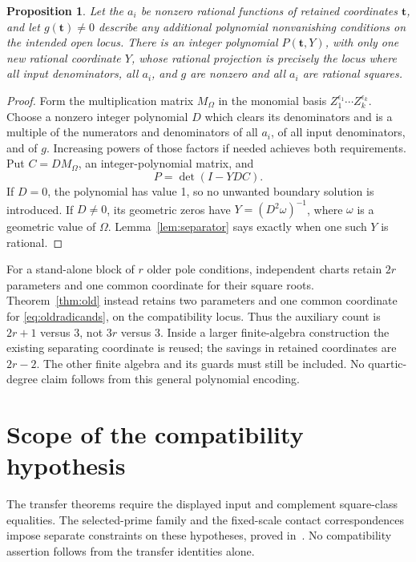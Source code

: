\documentclass[11pt,a4paper]{article}
\newtheorem{proposition}[theorem]{Proposition}
\theoremstyle{definition}\newtheorem{definition}[theorem]{Definition}
\theoremstyle{remark}\newtheorem{remark}[theorem]{Remark}
\begin{document}
\begin{proposition}\label{prop:onecoordinate}
Let the $a_i$ be nonzero rational functions of retained coordinates
$\boldsymbol t$, and let $g(\boldsymbol t)\ne0$ describe any additional
polynomial nonvanishing conditions on the intended open locus.
There is an integer polynomial $P(\boldsymbol t,Y)$, with only one new
rational coordinate $Y$, whose rational projection is precisely the
locus where all input denominators, all $a_i$, and $g$ are nonzero and
all $a_i$ are rational squares.
\end{proposition}
\begin{proof}
Form the multiplication matrix $M_\Omega$ in the monomial basis
$Z_1^{\epsilon_1}\cdots Z_k^{\epsilon_k}$. Choose a nonzero integer
polynomial $D$ which clears its denominators and is a multiple of the
numerators and denominators of all $a_i$, of all input denominators,
and of $g$. Increasing powers of those factors if needed achieves both
requirements. Put $C=D M_\Omega$, an integer-polynomial matrix, and
\[
                         P=\det(I-YDC).
\]
If $D=0$, the polynomial has value 1, so no unwanted boundary solution
is introduced. If $D\ne0$, its geometric zeros have
$Y=(D^2\omega)^{-1}$, where $\omega$ is a geometric value of $\Omega$.
Lemma~\ref{lem:separator} says exactly when one such $Y$ is rational.
\end{proof}

For a stand-alone block of $r$ older pole conditions, independent
charts retain $2r$ parameters and one common coordinate for their square
roots. Theorem~\ref{thm:old} instead retains two parameters and one
common coordinate for \eqref{eq:oldradicands}, on the compatibility
locus. Thus the auxiliary count is $2r+1$ versus $3$, not $3r$ versus
$3$. Inside a larger finite-algebra construction the existing separating
coordinate is reused; the savings in retained coordinates are
$2r-2$. The other finite algebra and its guards must still be included.
No quartic-degree claim follows from this general polynomial encoding.

\section{Scope of the compatibility hypothesis}
The transfer theorems require the displayed input and complement
square-class equalities. The selected-prime family and the
fixed-scale contact correspondences impose separate constraints on
these hypotheses, proved in~\cite{MatchingObstructions}. No
compatibility assertion follows from the transfer identities alone.
\end{document}
